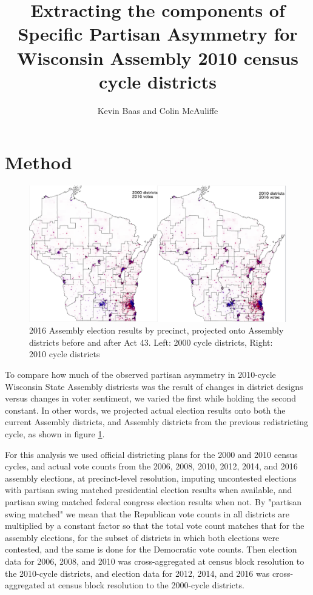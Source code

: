 \documentclass[preprint,12pt]{article}
\begin{document}
\title{Extracting the components of Specific Partisan Asymmetry for Wisconsin Assembly 2010 census cycle districts}
\author{Kevin Baas and Colin McAuliffe}
\maketitle

\section{Method}

\begin{figure}[htb!]
    \begin{center}
        \includegraphics[scale=0.25]{../Figures/WI_compared/precincts_pop_combined.png}
        \caption{2016 Assembly election results by precinct, projected onto Assembly districts before and after Act 43. Left: 2000 cycle districts, Right: 2010 cycle districts}\label{fig:Maps}
    \end{center}
\end{figure}

To compare how much of the observed partisan asymmetry in 2010-cycle Wisconsin State Assembly districsts was the result of changes in district designs versus changes in voter sentiment, we varied the first while holding the second constant.
In other words, we projected actual election results onto both the current Assembly districts, and Assembly districts from the previous redistricting cycle, as shown in figure \ref{fig:Maps}.

For this analysis we used official districting plans for the 2000 and 2010 census cycles, and actual vote counts from the 2006, 2008, 2010, 2012, 2014, and 2016 assembly elections, at precinct-level resolution, imputing uncontested elections with partisan swing matched presidential election results when available, and partisan swing matched federal congress election results when not.
By "partisan swing matched" we mean that the Republican vote counts in all districts are multiplied by a constant factor so that the total vote count matches that for the assembly elections, for the subset of districts in which both elections were contested, and the same is done for the Democratic vote counts.
Then election data for 2006, 2008, and 2010 was cross-aggregated at census block resolution to the 2010-cycle districts, and election data for 2012, 2014, and 2016 was cross-aggregated at census block resolution to the 2000-cycle districts. 
 
\end{document}
